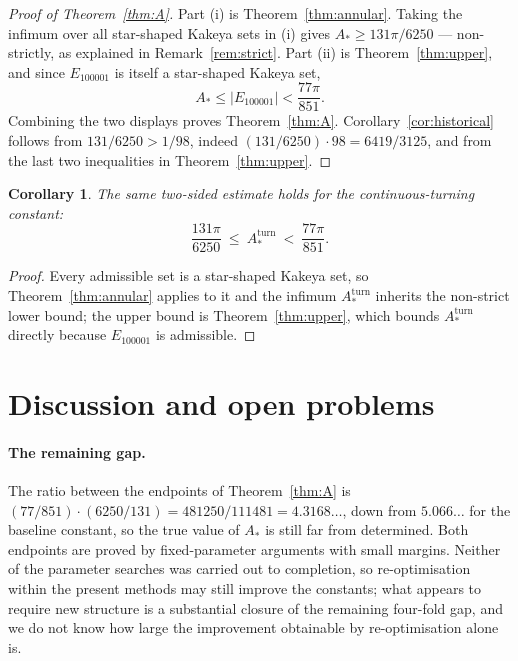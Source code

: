 \documentclass[11pt]{article}
\theoremstyle{plain}
\newtheorem{corollary}[theorem]{Corollary}
\theoremstyle{definition}
\theoremstyle{remark}
\newcommand{\Astar}{A_{*}}
\newcommand{\Aturn}{A_{*}^{\mathrm{turn}}}
\begin{document}
\begin{proof}[Proof of Theorem~\ref{thm:A}]
Part (i) is Theorem~\ref{thm:annular}. Taking the infimum over all star-shaped
Kakeya sets in (i) gives $\Astar\ge131\pi/6250$ --- non-strictly, as explained in
Remark~\ref{rem:strict}. Part (ii) is Theorem~\ref{thm:upper}, and since
$E_{100001}$ is itself a star-shaped Kakeya set,
\[
  \Astar\le|E_{100001}|<\frac{77\pi}{851}.
\]
Combining the two displays proves Theorem~\ref{thm:A}. Corollary~\ref{cor:historical}
follows from $131/6250>1/98$, indeed $(131/6250)\cdot98=6419/3125$, and from the
last two inequalities in Theorem~\ref{thm:upper}.
\end{proof}

\begin{corollary}\label{cor:turning}
The same two-sided estimate holds for the continuous-turning constant:
\[
  \frac{131\pi}{6250}\ \le\ \Aturn\ <\ \frac{77\pi}{851}.
\]
\end{corollary}

\begin{proof}
Every admissible set is a star-shaped Kakeya set, so Theorem~\ref{thm:annular}
applies to it and the infimum $\Aturn$ inherits the non-strict lower bound; the
upper bound is Theorem~\ref{thm:upper}, which bounds $\Aturn$ directly because
$E_{100001}$ is admissible.
\end{proof}

\section{Discussion and open problems}\label{sec:discussion}

\paragraph{The remaining gap.} The ratio between the endpoints of
Theorem~\ref{thm:A} is $(77/851)\cdot(6250/131)=481250/111481=4.3168\ldots$, down
from $5.066\ldots$ for the baseline constant, so the true value of $\Astar$ is
still far from determined. Both endpoints are proved by fixed-parameter
arguments with small margins. Neither of the parameter searches was carried out
to completion, so re-optimisation within the present methods may still improve
the constants; what appears to require new structure is a substantial closure of
the remaining four-fold gap, and we do not know how large the improvement
obtainable by re-optimisation alone is.
\end{document}
